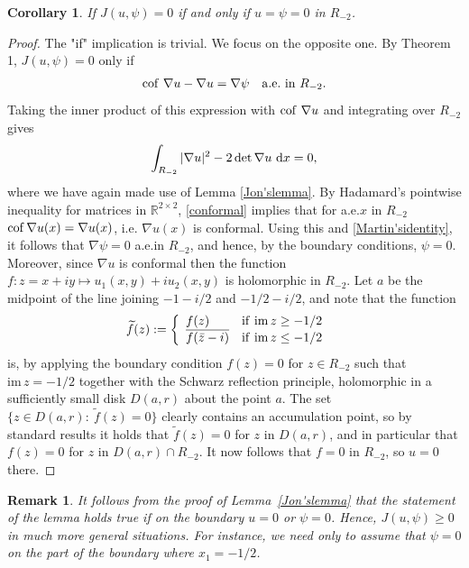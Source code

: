 \documentclass[12pt]{amsart}
\newcommand{\md}{{\rm d}}
\newcommand{\dx}{\, \md x}
\newcommand{\R}{\mathbb{R}}
\newcommand{\cof}{{\rm cof}\,}
\newcommand{\1}{{\bf 1}}
\newcommand{\im}{\mathrm{im}\,}
\newtheorem{corollary}[definition]{Corollary}
\newtheorem{remark}[definition]{Remark}
\begin{document}
\begin{corollary}
If $J(u,\psi)=0$ if and only if $u=\psi=0$ in $R_{-2}$.
\end{corollary}
\begin{proof}
The "if" implication is trivial. We focus on the opposite one.
By Theorem 1, $J(u,\psi)=0$ only if 
\begin{align}\label{Martin'sidentity}\cof \, \nabla u - \nabla u = \nabla \psi \quad \mathrm{a.e. \ in} \ R_{-2}.
\end{align}
Taking the inner product of this expression with $\cof \, \nabla u$ and integrating over $R_{-2}$ gives 
\begin{align}\label{conformal}\int_{R_{-2}}|\nabla u|^2 - 2 \det \nabla u \, \dx = 0,
\end{align}
where we have again made use of Lemma \ref{Jon'slemma}. By Hadamard's pointwise inequality for matrices in $\R^{2 \times 2}$, \eqref{conformal} implies that for a.e.\@ $x$ in $R_{-2}$ $\cof \nabla u(x) = \nabla u(x)$, i.e. $\nabla u(x)$ is conformal.  Using this and \eqref{Martin'sidentity}, it follows that $\nabla \psi=0$ a.e.\@ in $R_{-2}$, and hence, by the boundary conditions, $\psi=0$.  Moreover, since $\nabla u$ is conformal then the function $f: z=x+iy \mapsto u_1(x,y)+iu_2(x,y)$ is holomorphic in $R_{-2}$.  Let $a$ be the midpoint of the line joining $-1-i/2$ and $-1/2-i/2$, and note that the function
\begin{align*}
    \widetilde{f}(z)& :=\left\{ \begin{array}{l l } f(z) & \mathrm{if} \ \im z \geq -1/2  \\
    \overline{f(\bar{z}-i)} & \mathrm{if} \ \im z \leq -1/2 
    \end{array}\right.
\end{align*}
is, by applying the boundary condition $f(z)=0$ for $z \in R_{-2}$ such that $\im z = -1/2$ together with the Schwarz reflection principle, holomorphic in a sufficiently small disk $D(a,r)$ about the point $a$.  The set $\{z\in D(a,r): \ \widetilde{f}(z)=0\}$ clearly contains an accumulation point, so by standard results it holds that $\widetilde{f}(z) = 0$ for $z$ in $D(a,r)$, and in particular that $f(z)=0$ for  $z$ in $D(a,r) \cap R_{-2}$.  It now follows that $f=0$ in $R_{-2}$, so $u=0$ there. 


\end{proof}

\begin{remark}\label{BC}
    It follows from the proof of Lemma~\ref{Jon'slemma} that the statement of the lemma holds true if 
    on the boundary $u=0$ or $\psi=0$. Hence, $J(u,\psi)\ge 0$ in much more general situations. For instance,  we need only to assume that $\psi=0$ on the part of the boundary where $x_1=-1/2$.
\end{remark}
    
\end{document}
